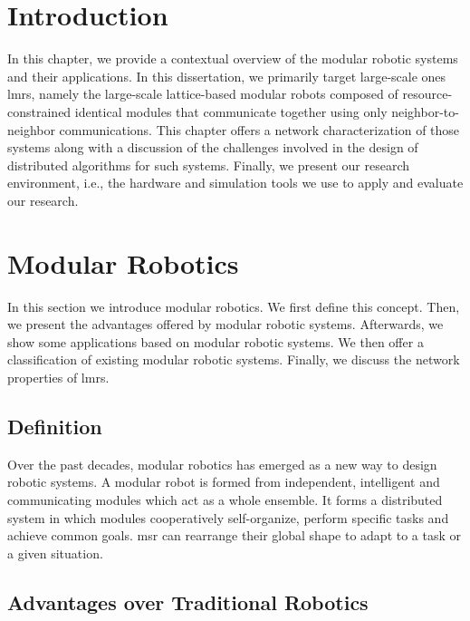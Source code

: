 \section{Introduction}

In this chapter, we provide a contextual overview of the modular robotic systems and their applications. In this dissertation, we primarily target large-scale ones \gls{lmrs}, namely the large-scale lattice-based modular robots composed of resource-constrained identical modules that communicate together using only neighbor-to-neighbor communications. This chapter offers a network characterization of those systems along with a discussion of the challenges involved in the design of distributed algorithms for such systems. Finally, we present our research environment, i.e., the hardware and simulation tools we use to apply and evaluate our research.

\section{Modular Robotics}

In this section we introduce modular robotics. We first define this concept. Then, we present the advantages offered by modular robotic systems.  Afterwards, we show some applications based on modular robotic systems. We then offer a classification of existing modular robotic systems. Finally, we discuss the network properties of \gls{lmrs}.

\subsection{Definition}

Over the past decades, modular robotics has emerged as a new way to design robotic systems. A modular robot is formed from independent, intelligent and communicating modules which act as a whole ensemble. It forms a distributed system in which modules cooperatively self-organize, perform specific tasks and achieve common goals. \acrfull{msr} can rearrange their global shape to adapt to a task or a given situation.

\subsection{Advantages over Traditional Robotics}

